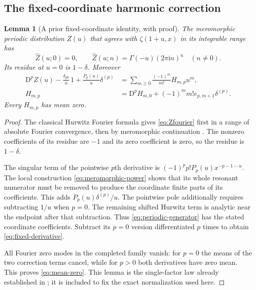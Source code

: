 \documentclass[11pt]{article}
\newtheorem{lemma}[theorem]{Lemma}
\theoremstyle{definition}\newtheorem{definition}[theorem]{Definition}
\theoremstyle{remark}\newtheorem{remark}[theorem]{Remark}
\newcommand{\ii}{\mathrm i}
\newcommand{\D}{\mathrm D}
\begin{document}
\subsection{The fixed-coordinate harmonic correction}
\begin{lemma}[A prior fixed-coordinate identity, with proof]\label{lem:periodic}
The meromorphic periodic distribution $Z(u)$ that agrees with $\zeta(1+u,x)$ in its integrable range has
\begin{equation}\label{eq:Zfourier}
\widehat Z(u;0)=0,\qquad
\widehat Z(u;n)=\Gamma(-u)(2\pi\ii n)^u\quad(n\ne0).
\end{equation}
Its residue at $u=0$ is $1-\delta$. Moreover
\begin{align}\label{eq:periodic-generator}
\D^pZ(u)-\frac{\delta_{p0}}u\,1+\frac{P_p(u)}u\delta^{(p)}
&=\sum_{m\ge0}\frac{(-1)^m}{m!}H_{m,p}u^m,\\
H_{m,p}&=\D^pH_{m,0}+(-1)^mm!e_{p,m+1}\delta^{(p)}.\label{eq:fixed-derivative}
\end{align}
Every $H_{m,p}$ has mean zero.
\end{lemma}
\begin{proof}
The classical Hurwitz Fourier formula gives \eqref{eq:Zfourier} first in a range of absolute Fourier convergence, then by meromorphic continuation \cite{DLMFH}. The nonzero coefficients of its residue are $-1$ and its zero coefficient is zero, so the residue is $1-\delta$.

The singular term of the pointwise $p$th derivative is
$(-1)^pp!P_p(u)x^{-p-1-u}$.
The local construction \eqref{eq:meromorphic-power} shows that its whole resonant numerator must be removed to produce the coordinate finite parts of its coefficients. This adds $P_p(u)\delta^{(p)}/u$. The pointwise pole additionally requires subtracting $1/u$ when $p=0$. The remaining shifted Hurwitz term is analytic near the endpoint after that subtraction. Thus \eqref{eq:periodic-generator} has the stated coordinate coefficients. Subtract its $p=0$ version differentiated $p$ times to obtain \eqref{eq:fixed-derivative}.

All Fourier zero modes in the completed family vanish: for $p=0$ the means of the two correction terms cancel, while for $p>0$ both derivatives have zero mean. This proves \eqref{eq:mean-zero}. This lemma is the single-factor law already established in \cite{collisions}; it is included to fix the exact normalization used here.
\end{proof}
\end{document}
